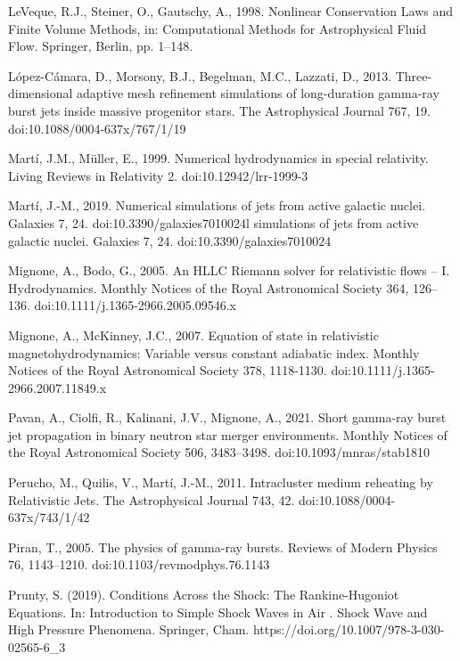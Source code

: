 \documentclass[12pt,a4paper]{book}
\begin{document}
\begin{thebibliography}{40}
LeVeque, R.J., Steiner, O., Gautschy, A., 1998. Nonlinear Conservation Laws and Finite Volume Methods, in: Computational Methods for Astrophysical Fluid Flow. Springer, Berlin, pp. 1–148. 

 López-Cámara, D., Morsony, B.J., Begelman, M.C., Lazzati, D., 2013. Three-dimensional adaptive mesh refinement simulations of long-duration gamma-ray 
burst jets inside massive progenitor stars. The Astrophysical Journal 767, 19. doi:10.1088/0004-637x/767/1/19


Martí, J.M., Müller, E., 1999. Numerical hydrodynamics in special relativity. Living Reviews in Relativity 2. doi:10.12942/lrr-1999-3

Martí, J.-M., 2019. Numerical simulations of jets from active galactic nuclei. Galaxies 7, 24. doi:10.3390/galaxies7010024l simulations of jets from active galactic nuclei. Galaxies 7, 24. doi:10.3390/galaxies7010024

Mignone, A., Bodo, G., 2005. An HLLC Riemann solver for relativistic flows -- I. Hydrodynamics. Monthly Notices of the Royal Astronomical Society 364, 126–136. doi:10.1111/j.1365-2966.2005.09546.x 

Mignone, A., McKinney, J.C., 2007. Equation of state in relativistic magnetohydrodynamics: Variable versus constant adiabatic index. Monthly Notices of the 
Royal Astronomical Society 378, 1118-1130. doi:10.1111/j.1365-2966.2007.11849.x

 Pavan, A., Ciolfi, R., Kalinani, J.V., Mignone, A., 2021. Short gamma-ray burst jet propagation in binary neutron star merger environments. Monthly Notices of the Royal Astronomical Society 506, 
3483–3498. doi:10.1093/mnras/stab1810

 Perucho, M., Quilis, V., Martí, J.-M., 2011. Intracluster medium reheating by Relativistic Jets. The Astrophysical Journal 743, 42. doi:10.1088/0004-637x/743/1/42 

 Piran, T., 2005. The physics of gamma-ray bursts. Reviews of Modern Physics 76, 1143–1210. doi:10.1103/revmodphys.76.1143 

Prunty, S. (2019). Conditions Across the Shock: The Rankine-Hugoniot Equations. In: Introduction to Simple Shock Waves in Air . Shock Wave and High Pressure Phenomena. Springer, Cham. https://doi.org/10.1007/978-3-030-02565-6\_3


\end{thebibliography}
\end{document}
